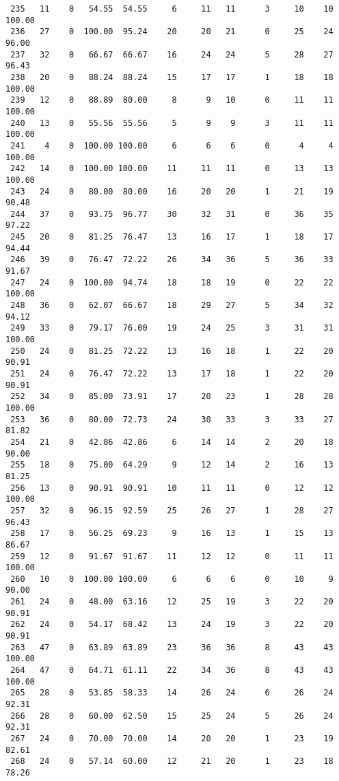 \begin{verbatim}
 235   11    0   54.55  54.55     6     11   11      3     10    10   100.00
 236   27    0  100.00  95.24    20     20   21      0     25    24    96.00
 237   32    0   66.67  66.67    16     24   24      5     28    27    96.43
 238   20    0   88.24  88.24    15     17   17      1     18    18   100.00
 239   12    0   88.89  80.00     8      9   10      0     11    11   100.00
 240   13    0   55.56  55.56     5      9    9      3     11    11   100.00
 241    4    0  100.00 100.00     6      6    6      0      4     4   100.00
 242   14    0  100.00 100.00    11     11   11      0     13    13   100.00
 243   24    0   80.00  80.00    16     20   20      1     21    19    90.48
 244   37    0   93.75  96.77    30     32   31      0     36    35    97.22
 245   20    0   81.25  76.47    13     16   17      1     18    17    94.44
 246   39    0   76.47  72.22    26     34   36      5     36    33    91.67
 247   24    0  100.00  94.74    18     18   19      0     22    22   100.00
 248   36    0   62.07  66.67    18     29   27      5     34    32    94.12
 249   33    0   79.17  76.00    19     24   25      3     31    31   100.00
 250   24    0   81.25  72.22    13     16   18      1     22    20    90.91
 251   24    0   76.47  72.22    13     17   18      1     22    20    90.91
 252   34    0   85.00  73.91    17     20   23      1     28    28   100.00
 253   36    0   80.00  72.73    24     30   33      3     33    27    81.82
 254   21    0   42.86  42.86     6     14   14      2     20    18    90.00
 255   18    0   75.00  64.29     9     12   14      2     16    13    81.25
 256   13    0   90.91  90.91    10     11   11      0     12    12   100.00
 257   32    0   96.15  92.59    25     26   27      1     28    27    96.43
 258   17    0   56.25  69.23     9     16   13      1     15    13    86.67
 259   12    0   91.67  91.67    11     12   12      0     11    11   100.00
 260   10    0  100.00 100.00     6      6    6      0     10     9    90.00
 261   24    0   48.00  63.16    12     25   19      3     22    20    90.91
 262   24    0   54.17  68.42    13     24   19      3     22    20    90.91
 263   47    0   63.89  63.89    23     36   36      8     43    43   100.00
 264   47    0   64.71  61.11    22     34   36      8     43    43   100.00
 265   28    0   53.85  58.33    14     26   24      6     26    24    92.31
 266   28    0   60.00  62.50    15     25   24      5     26    24    92.31
 267   24    0   70.00  70.00    14     20   20      1     23    19    82.61
 268   24    0   57.14  60.00    12     21   20      1     23    18    78.26

\end{verbatim}
